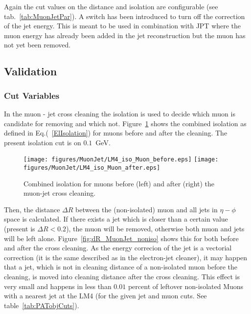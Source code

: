 \documentclass{cmspaper}
\begin{document}
Again the cut values on the distance and isolation are configurable (see
tab.~\ref{tab:MuonJetPar}). A switch has been introduced to turn off the
correction of the jet energy. This is meant to be used in combination with JPT
where the muon energy has already been added in the jet reconstruction but the
muon has not yet been removed.

\subsection{Validation}
\subsubsection{Cut Variables}
In the muon - jet cross cleaning the isolation is used to decide which muon is
candidate for removing and which not. Figure~\ref{fig:MuonIsolation} shows the
combined isolation as defined in Eq.(~\ref{ElIsolation}) for muons before and
after the cleaning. The present isolation cut is on $0.1$\ GeV. 

\begin{figure}[hb]
\begin{center}
    \texttt{[image: figures/MuonJet/LM4\_iso\_Muon\_before.eps]}
    \texttt{[image: figures/MuonJet/LM4\_iso\_Muon\_after.eps]}
    \caption{Combined isolation for muons before (left) and after (right) the
    muon-jet cross cleaning.}
\label{fig:MuonIsolation}
\end{center}
\end{figure}


Then, the distance \(\Delta R\) between the (non-isolated) muon and all jets in
\(\eta - \phi\) space is calculated. If there exists a jet which is closer than
a certain value (present is \(\Delta R < 0.2\)), the muon will be removed,
otherwise both muon and jets will be left alone.
Figure~\ref{fig:dR_MuonJet_noniso} shows this for both before and after the cross
cleaning. As the energy correcion of the jet is a vectorial correction (it is the same described as in the electron-jet cleaner), it may
happen that a jet, which is not in cleaning distance of a non-isolated muon
before the cleaning, is moved into cleaning distance after the cross cleaning.
This effect is very small and happens in less than \(0.01\) percent of leftover non-isolated Muons with a nearest jet at the LM4 (for the given jet and muon cuts. See table~\ref{tab:PATobjCuts}).
\end{document}
